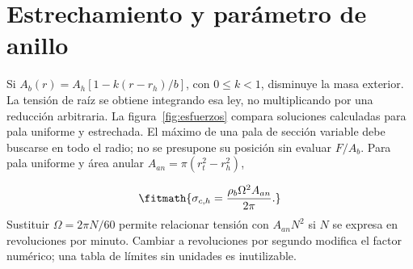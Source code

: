 \documentclass[10pt,openany]{book}
\begin{document}
\section{Estrechamiento y parámetro de anillo}

Si \(A_b(r)=A_h[1-k(r-r_h)/b]\), con \(0\leq k<1\), disminuye la masa exterior. La tensión de raíz se obtiene integrando esa ley, no multiplicando por una reducción arbitraria. La figura~\ref{fig:esfuerzos} compara soluciones calculadas para pala uniforme y estrechada. El máximo de una pala de sección variable debe buscarse en todo el radio; no se presupone su posición sin evaluar \(F/A_b\).
Para pala uniforme y área anular \(A_{an}=\pi(r_t^2-r_h^2)\),

\[
\fitmath{\sigma_{c,h}=\frac{\rho_b\Omega^2A_{an}}{2\pi}.}
\]
Sustituir \(\Omega=2\pi N/60\) permite relacionar tensión con \(A_{an}N^2\) si \(N\) se expresa en revoluciones por minuto. Cambiar a revoluciones por segundo modifica el factor numérico; una tabla de límites sin unidades es inutilizable.
\end{document}
